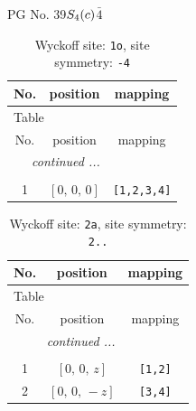 \documentclass[fleqn,8pt]{jsarticle}
\begin{document}
\setcounter{MaxMatrixCols}{32}

\renewcommand{\tablename}{Table~}
\renewcommand{\figurename}{Figure~}
\begin{center}
\LARGE
PG No. 39\quad$S_{\rm 4}(c)$\quad$\bar{4}$\quad[ tetragonal ]
\end{center}
\renewcommand{\arraystretch}{1.2}
\begin{longtable}{ccc}
\caption{Wyckoff site: {\tt 1o}, site symmetry: {\tt -4}}
 \\
 \hline \hline
No. & position & mapping \\ \hline \endfirsthead

\multicolumn{2}{l}{\tablename\ \thetable{}} \\
 \hline \hline
No. & position & mapping \\ \hline \endhead

 \hline \hline
\multicolumn{2}{r}{\footnotesize\it continued ...} \\ \endfoot

 \hline \hline
\multicolumn{2}{r}{} \\ \endlastfoot

1 & $\left[ 0,\, 0,\, 0 \right]$ & {\tt [1,2,3,4]} \\
\end{longtable}
\renewcommand{\arraystretch}{1.2}
\begin{longtable}{ccc}
\caption{Wyckoff site: {\tt 2a}, site symmetry: {\tt 2..}}
 \\
 \hline \hline
No. & position & mapping \\ \hline \endfirsthead

\multicolumn{2}{l}{\tablename\ \thetable{}} \\
 \hline \hline
No. & position & mapping \\ \hline \endhead

 \hline \hline
\multicolumn{2}{r}{\footnotesize\it continued ...} \\ \endfoot

 \hline \hline
\multicolumn{2}{r}{} \\ \endlastfoot

1 & $\left[ 0,\, 0,\, z \right]$ & {\tt [1,2]} \\ \hline
2 & $\left[ 0,\, 0,\, - z \right]$ & {\tt [3,4]} \\
\end{longtable}
\renewcommand{\arraystretch}{1.2}
\end{document}
